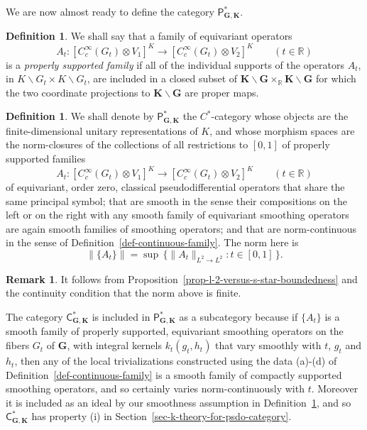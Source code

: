 \documentclass[leqno,11pt]{amsart}
\numberwithin{equation}{subsection}
\theoremstyle{plain}
\theoremstyle{definition}
\newtheorem{definition}[equation]{Definition}
\newtheorem{remark}[equation]{Remark}
\theoremstyle{remark}
\newcommand{\R}{\mathbb{R}}
\newcommand{\GG}{\pmb{G}}
\newcommand{\KK}{\pmb{K}}
\newcommand{\PSDO}{\mathsf{P}}
\newcommand{\CC}{\mathsf{C}}
\begin{document}
We are now almost ready to define the category $\PSDO^*_{\GG,\KK}$.  


\begin{definition} 
We shall say that a family of equivariant operators 
\[
A _t \colon [C_c^\infty (  G_t )\otimes  V_1]^K  \longrightarrow [C_c^\infty (  G_t )\otimes  V_2]^K \qquad (t \in \R) 
\]
is a \emph{properly supported family} if all of the individual supports of the operators $A_t$, in $K \backslash G_t \times K\backslash G_t$, are included in a closed subset of $\KK\backslash \GG \times_\R\KK\backslash \GG$ for which the two coordinate projections to $\KK\backslash \GG$ are proper maps.  
\end{definition} 

\begin{definition}
\label{def-c-star-category-of-families}
    We shall denote by $\PSDO^*_{\GG,\KK}$ the $C^*$-category whose objects are the finite-dimensional unitary representations of $K$, and whose morphism spaces are the  norm-closures of the collections of all restrictions to $[0,1]$ of properly supported  families 
    \[
    A_t \colon  [C_c^\infty (  G_t )\otimes  V_1]^K  \longrightarrow [C_c^\infty (  G_t )\otimes  V_2]^K \qquad (t \in \R) 
    \]
    of equivariant, order zero, classical pseudodifferential operators that share the same principal symbol; that are smooth in the sense their compositions on the left or on the right with any smooth family of equivariant smoothing operators are again smooth families of smoothing operators; and that are norm-continuous in the sense of Definition~\ref{def-continuous-family}.  The norm here is 
    \[
    \| \{ A_t\} \| = \sup \, \{ \|A_t \|_{L^2\to L^2} : t \in [0,1]\,\}.
    \]
\end{definition}

\begin{remark} 
It follows from Proposition~\ref{prop-l-2-versus-s-star-boundedness} and the continuity condition that the norm above  is finite.
\end{remark} 

The category  $\CC^*_{\GG,\KK}$ is included in $\PSDO^*_{\GG,\KK}$  as a subcategory because if $\{ A_t\}$ is a smooth family of properly supported, equivariant smoothing operators on the fibers $G_t$ of $\pmb G$, with integral kernels $k_t(g_t,h_t)$ that vary smoothly with  $t$, $g_t$ and $h_t$, then any of the local trivializations constructed using the data (a)-(d) of Definition~\ref{def-continuous-family} is a smooth family of compactly supported smoothing operators, and so certainly varies norm-continuously with $t$.    Moreover it is included as an ideal by our smoothness assumption in Definition~\ref{def-c-star-category-of-families}, and so $\CC^*_{\GG,\KK}$ has property (i) in Section~\ref{sec-k-theory-for-psdo-category}.  
\end{document}
